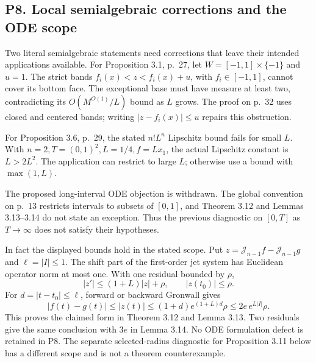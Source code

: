 \documentclass[10pt]{article}
\begin{document}
\subsection*{P8. Local semialgebraic corrections and the ODE scope}
Two literal semialgebraic statements need corrections that leave their intended applications available. For Proposition 3.1, p. 27, let \(W=[-1,1]\times\{-1\}\) and \(u=1\). The strict bands \(f_i(x)<z<f_i(x)+u\), with \(f_i\in[-1,1]\), cannot cover its bottom face. The exceptional base must have measure at least two, contradicting its \(O(M^{O(1)}/L)\) bound as \(L\) grows. The proof on p. 32 uses closed and centered bands; writing \(\left|z-f_i(x)\right|\le u\) repairs this obstruction.\par
For Proposition 3.6, p. 29, the stated \(n!L^n\) Lipschitz bound fails for small \(L\). With \(n=2,T=(0,1)^2,L=1/4,f=Lx_1\), the actual Lipschitz constant is \(L>2L^2\). The application can restrict to large \(L\); otherwise use a bound with \(\max(1,L)\).\par
The proposed long-interval ODE objection is withdrawn. The global convention on p. 13 restricts intervals to subsets of \([0,1]\), and Theorem 3.12 and Lemmas 3.13–3.14 do not state an exception. Thus the previous diagnostic on \([0,T]\) as \(T\to\infty\) does not satisfy their hypotheses.\par
In fact the displayed bounds hold in the stated scope. Put \(z=\mathcal J_{n-1}f-\mathcal J_{n-1}g\) and \(\ell=|I|\le1\). The shift part of the first-order jet system has Euclidean operator norm at most one. With one residual bounded by \(\rho\), \[|z'|\le(1+L)|z|+\rho,\qquad |z(t_0)|\le\rho .\] For \(d=|t-t_0|\le\ell\), forward or backward Gronwall gives \[|f(t)-g(t)|\le |z(t)|
 \le(1+d)e^{(1+L)d}\rho
 \le 2e\,e^{L|I|}\rho .\] This proves the claimed form in Theorem 3.12 and Lemma 3.13. Two residuals give the same conclusion with \(3e\) in Lemma 3.14. No ODE formulation defect is retained in P8. The separate selected-radius diagnostic for Proposition 3.11 below has a different scope and is not a theorem counterexample.\par
\end{document}
